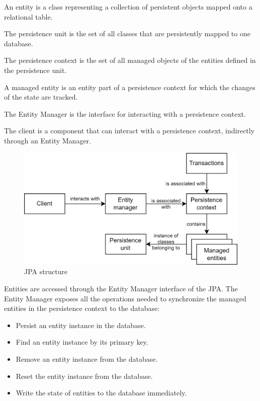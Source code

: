 \begin{definition}
    An entity is a class representing a collection of persistent objects mapped onto a relational table.
\end{definition}
\begin{definition}
    The persistence unit is the set of all classes that are persistently mapped to one database.
\end{definition}
\begin{definition}
    The persistence context is the set of all managed objects of the entities defined in the persistence unit.
\end{definition}
\begin{definition}
    A managed entity is an entity part of a persistence context for which the changes of the state are tracked.
\end{definition}
\begin{definition}
    The Entity Manager is the interface for interacting with a persistence context.
\end{definition}
\begin{definition}    
    The client is a component that can interact with a persistence context, indirectly through an Entity Manager.
\end{definition}
\begin{figure}[H]
    \centering
    \includegraphics[width=0.75\linewidth]{images/jpa.png}
    \caption{JPA structure}
\end{figure}
Entities are accessed through the Entity Manager interface of the JPA. 
The Entity Manager exposes all the operations needed to synchronize the managed entities in the persistence context to the database:
\begin{itemize}
    \item Persist an entity instance in the database.
    \item Find an entity instance by its primary key.
    \item Remove an entity instance from the database.
    \item Reset the entity instance from the database.
    \item Write the state of entities to the database immediately.
\end{itemize}

